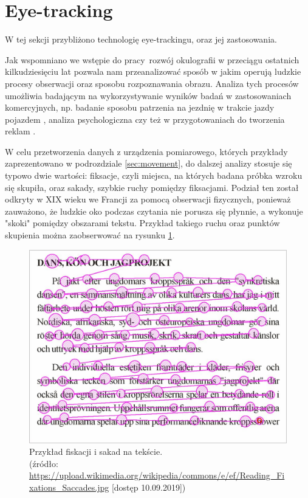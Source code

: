 \section{Eye-tracking}
\label{sec:eyetracking}
W tej sekcji przybliżono technologię eye-trackingu, oraz jej zastosowania.\par
Jak wspomniano we wstępie do pracy\, rozwój okulografii w przeciągu ostatnich kilkudziesięciu lat pozwala nam przeanalizować sposób w jakim operują ludzkie procesy obserwacji oraz sposobu rozpoznawania obrazu. Analiza tych procesów umożliwia badającym na wykorzystywanie wyników badań w zastosowaniach komercyjnych, np. badanie sposobu patrzenia na jezdnię w trakcie jazdy pojazdem \cite{CarSteering}, analiza psychologiczna \cite{GazeEyeTrackingSolutions} czy też w przygotowaniach do tworzenia reklam \cite{Advertising}.\par
W celu przetworzenia danych z urządzenia pomiarowego, których przykłady zaprezentowano w podrozdziale \ref{sec:movement}, do dalszej analizy stosuje się typowo dwie wartości: fiksacje, czyli miejsca, na których badana próbka wzroku się skupiła, oraz sakady, szybkie ruchy pomiędzy fiksacjami. Podział ten został odkryty w XIX wieku we Francji za pomocą obserwacji fizycznych, ponieważ zauważono, że ludzkie oko podczas czytania nie porusza się płynnie, a wykonuje "skoki" pomiędzy obszarami tekstu. Przykład takiego ruchu oraz punktów skupienia można zaobserwować na rysunku \ref{fig:fiksacje}.
\begin{figure}[H]
    \centering
    \captionsetup{justification=centering,margin=2cm}
    \includegraphics[width=0.8\linewidth]{resources/fixation_example.jpg}
    \caption[Przykład fiskacji i sakad na tekście.]{Przykład fiskacji i sakad na tekście.\\\hspace{\textwidth}
    \small(źródło: \url{https://upload.wikimedia.org/wikipedia/commons/e/ef/Reading_Fixations_Saccades.jpg} [dostęp 10.09.2019])}
    \label{fig:fiksacje}
\end{figure}
